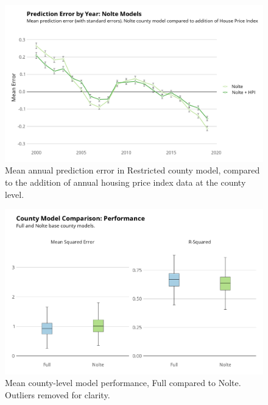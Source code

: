 \documentclass[12pt]{article}
\begin{document}
\begin{figure}[H]
    \centering
    \includegraphics[width=1\textwidth]{exhibits/nolte_resid_time.png}
    \caption{Mean annual prediction error in Restricted county model, compared to the addition of annual housing price index data at the county level.}
    \label{fig:nolte_resid_time}
\end{figure}

\begin{figure}[H]
    \centering
    \includegraphics[width=1\textwidth]{exhibits/county_compare_boxplot.png}
    \caption{Mean county-level model performance, Full compared to Nolte. Outliers removed for clarity.}
    \label{fig:county_compare_boxplot}
\end{figure}
\end{document}
